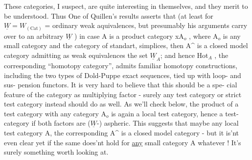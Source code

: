 
These categories, I suspect, are quite interesting in themselves, and
they merit to be understood. Thus One of Quillen's results asserts that
(at least for $\underline{W} = W_{(\mathrm{Cat})}$ = ordinary weak aquivalences, but presumably
his arguments  carry over to an arbitrary $\underline{W}$ ) in case A is a product
category \hand{$\Delta$}xA$_{o}$ , where A$_{o}$ is any small category and \hand{$\Delta$} the category of
standart,  simplices, then A\^{} is a closed model category admitting as
weak equivalences the set $\underline{W}_{A}$\hand{$^{(*)}$}; and hence \hand{(}Hot$_{A}$\hand{)} , the corresponding
``homotopy category'', admits familiar homotopy constructions, including
the two types of Dold-Puppe exact sequences, tied up with loop- and sus-%
pension functors. It is very hard to believe that this should be a spe-%
cial feature of the category \hand{$\Delta$} as  multiplying factor - surely any
test category or strict test category instead should do as well. As we'll
check below, the product of a  test category with any  
category A$_{o}$ is again a local test category, hence a test-category if
both factors are ($\underline{W}$-) aspheric. This suggests that maybe  any local test
category A, the corresponding A\^{} is a closed model category - but it
is'nt even clear yet if the same does'nt hold for \uline{any} small category A
whatever ! It's surely something worth looking at.

